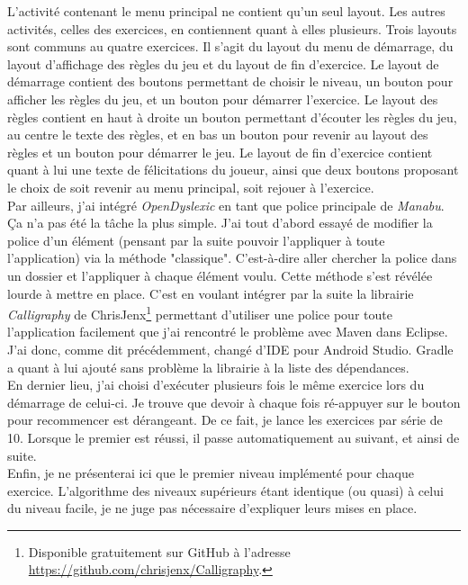 L'activité contenant le menu principal ne contient qu'un seul layout. Les autres activités, celles des exercices, en contiennent quant à elles plusieurs. Trois layouts sont communs au quatre exercices. Il s'agit du layout du menu de démarrage, du layout d'affichage des règles du jeu et du layout de fin d'exercice. Le layout de démarrage contient des boutons permettant de choisir le niveau, un bouton pour afficher les règles du jeu, et un bouton pour démarrer l'exercice. Le layout des règles contient en haut à droite un bouton permettant d'écouter les règles du jeu, au centre le texte des règles, et en bas un bouton pour revenir au layout des règles et un bouton pour démarrer le jeu. Le layout de fin d'exercice contient quant à lui une texte de félicitations du joueur, ainsi que deux boutons proposant le choix de soit revenir au menu principal, soit rejouer à l'exercice.\\

Par ailleurs, j'ai intégré \textit{OpenDyslexic} en tant que police principale de \textit{Manabu}. Ça n'a pas été la tâche la plus simple. J'ai tout d'abord essayé de modifier la police d'un élément (pensant par la suite pouvoir l'appliquer à toute l'application) via la méthode "classique". C'est-à-dire aller chercher la police dans un dossier et l'appliquer à chaque élément voulu. Cette méthode s'est révélée lourde à mettre en place. C'est en voulant intégrer par la suite la librairie \textit{Calligraphy} de ChrisJenx\footnote{Disponible gratuitement sur GitHub à l'adresse \url{https://github.com/chrisjenx/Calligraphy}.} permettant d'utiliser une police pour toute l'application facilement que j'ai rencontré le problème avec Maven dans Eclipse. J'ai donc, comme dit précédemment, changé d'IDE pour Android Studio. Gradle a quant à lui ajouté sans problème la librairie à la liste des dépendances.\\

En dernier lieu, j'ai choisi d'exécuter plusieurs fois le même exercice lors du démarrage de celui-ci. Je trouve que devoir à chaque fois ré-appuyer sur le bouton pour recommencer est dérangeant. De ce fait, je lance les exercices par série de 10. Lorsque le premier est réussi, il passe automatiquement au suivant, et ainsi de suite.\\

Enfin, je ne présenterai ici que le premier niveau implémenté pour chaque exercice. L'algorithme des niveaux supérieurs étant identique (ou quasi) à celui du niveau facile, je ne juge pas nécessaire d'expliquer leurs mises en place.

